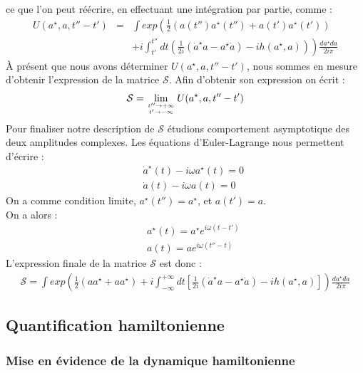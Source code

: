 \documentclass[a4paper,11pt]{article} %
\theoremstyle{plain}
\theoremstyle{definition}
\theoremstyle{remark}
\numberwithin{equation}{section}
\numberwithin{equation}{subsection}
\numberwithin{figure}{section}
\begin{document}
ce que l'on peut réécrire, en effectuant une intégration par partie, comme :
\begin{eqnarray*}
 U(a^{\star} , a, t''-t') &=& \int exp \left(  \frac{1}{2} \left( a(t'') a^{\star}(t'') + a(t') a^{\star}(t') \right)  \right. \nonumber \\
&& \left. + i \int_{t'}^{t''} dt \left( \frac{1}{2i} \left(\dot{a}^{\star}a - a^{\star} \dot{a} \right) - i h(a^{\star},a) \right) \right) 
\frac{da^{\star} da}{2i \pi}
\end{eqnarray*}
À présent que nous avons déterminer $U(a^{\star} , a, t''-t') $, nous sommes en mesure d'obtenir l'expression de la matrice  $\mathcal{S}$. Afin d'obtenir son expression on écrit : 
\begin{eqnarray*}
 \mathcal{S} = \lim_{t'' \to + \infty \atop t' \to - \infty} U(a^{\star} , a, t''-t')
\end{eqnarray*}
Pour finaliser notre description de $\mathcal{S}$ étudions comportement asymptotique des deux amplitudes complexes. Les équations d'Euler-Lagrange nous permettent d'écrire :
\begin{eqnarray*}
 &&\dot{a}^{\star}(t) - i \omega a^{\star}(t) = 0 \\
 &&\dot{a}(t) - i \omega a(t) = 0 
\end{eqnarray*}
On a comme condition limite, $a^{\star}(t'') = a^{\star}$, et $a(t')=a$.\\
On a alors :
\begin{eqnarray*}
 &&a^{\star}(t) = a^{\star} e^{ i \omega (t - t') }\\
 &&a(t) = a e^{ i \omega (t'' - t) }
\end{eqnarray*}
L'expression finale de la matrice $\mathcal{S}$ est donc :
\begin{eqnarray*}
 \mathcal{S} = \int exp \left(  \frac{1}{2} \left( a a^{\star} + a a^{\star} \right)  
+ i \int_{-\infty}^{+ \infty} dt \left[ \frac{1}{2i} \left(\dot{a}^{\star}a - a^{\star} \dot{a} \right) - i h(a^{\star},a) \right] \right) 
\frac{da^{\star} da}{2i \pi}
\end{eqnarray*}

  \subsection{Quantification hamiltonienne}

    \subsubsection{Mise en évidence de la dynamique hamiltonienne}
 
\end{document}

